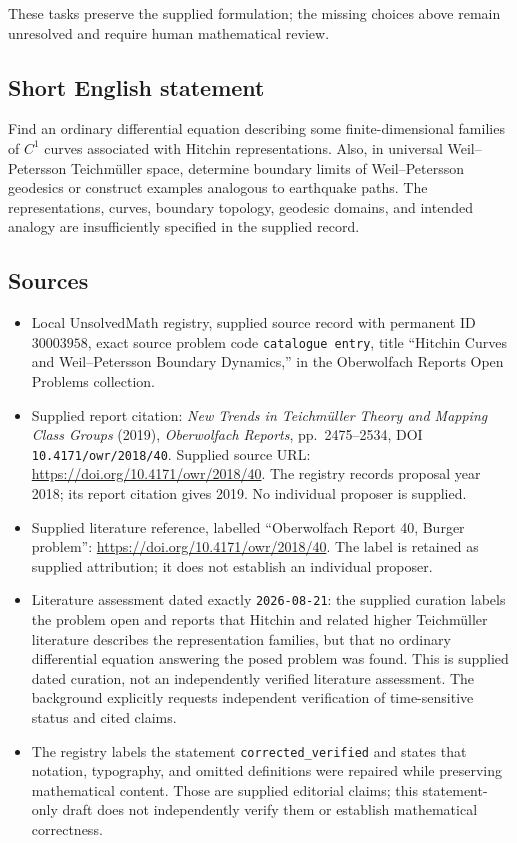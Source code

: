 \documentclass[11pt]{article}
\begin{document}
These tasks preserve the supplied formulation; the missing choices above remain unresolved and require human mathematical review.
\subsection{Short English statement}
Find an ordinary differential equation describing some finite-dimensional families of \(C^1\) curves associated with Hitchin representations. Also, in universal Weil--Petersson Teichm\"{u}ller space, determine boundary limits of Weil--Petersson geodesics or construct examples analogous to earthquake paths. The representations, curves, boundary topology, geodesic domains, and intended analogy are insufficiently specified in the supplied record.
\subsection{Sources}
\begin{itemize}
\item Local UnsolvedMath registry, supplied source record with permanent ID \(30003958\), exact source problem code \texttt{catalogue entry}, title ``Hitchin Curves and Weil--Petersson Boundary Dynamics,'' in the Oberwolfach Reports Open Problems collection.
\item Supplied report citation: \emph{New Trends in Teichm\"{u}ller Theory and Mapping Class Groups} (2019), \emph{Oberwolfach Reports}, pp.~2475--2534, DOI \texttt{10.4171/owr/2018/40}. Supplied source URL: \url{https://doi.org/10.4171/owr/2018/40}. The registry records proposal year 2018; its report citation gives 2019. No individual proposer is supplied.
\item Supplied literature reference, labelled ``Oberwolfach Report 40, Burger problem'': \url{https://doi.org/10.4171/owr/2018/40}. The label is retained as supplied attribution; it does not establish an individual proposer.
\item Literature assessment dated exactly \texttt{2026-08-21}: the supplied curation labels the problem open and reports that Hitchin and related higher Teichm\"{u}ller literature describes the representation families, but that no ordinary differential equation answering the posed problem was found. This is supplied dated curation, not an independently verified literature assessment. The background explicitly requests independent verification of time-sensitive status and cited claims.
\item The registry labels the statement \texttt{corrected\_verified} and states that notation, typography, and omitted definitions were repaired while preserving mathematical content. Those are supplied editorial claims; this statement-only draft does not independently verify them or establish mathematical correctness.
\end{itemize}
\end{document}
